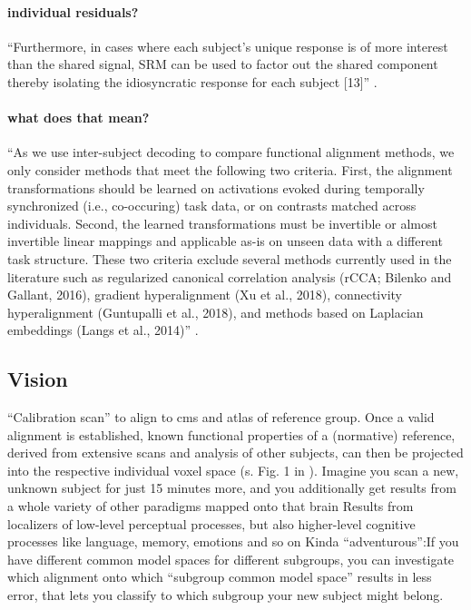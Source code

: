 \paragraph{individual residuals?}

%
``Furthermore, in cases where each subject's unique response is of more interest
than the shared signal, SRM can be used to factor out the shared component
thereby isolating the idiosyncratic response for each subject [13]''
\citep{kumar2020brainiak}.


\paragraph{what does that mean?}

``As we use inter-subject decoding to compare functional alignment methods, we
only consider methods that meet the following two criteria. First, the alignment
transformations should be learned on activations evoked during temporally
synchronized (i.e., co-occuring) task data, or on contrasts matched across
individuals. Second, the learned transformations must be invertible or almost
invertible linear mappings and applicable as-is on unseen data with a different
task structure. These two criteria exclude several methods currently used in the
literature such as regularized canonical correlation analysis (rCCA; Bilenko and
Gallant, 2016), gradient hyperalignment (Xu et al., 2018), connectivity
hyperalignment (Guntupalli et al., 2018), and methods based on Laplacian
embeddings (Langs et al., 2014)'' \citep{bazeille2021empirical}.

\subsection{Vision}

``Calibration scan'' to align to \ac{cms} and atlas of reference group.
%
Once a valid alignment is established, known functional properties of a
(normative) reference, derived from extensive scans and analysis of other
subjects, can then be projected into the respective individual voxel space (s.
Fig. 1 in \citep{nishimoto2016lining}).
%
Imagine you scan a new, unknown subject for just 15 minutes more, and you
additionally get results from a whole variety of other paradigms mapped onto
that brain
%
Results from localizers of low-level perceptual processes, but also higher-level
cognitive processes like language, memory, emotions and so on
%
Kinda ``adventurous'':If you have different common model spaces for different
subgroups, you can investigate which alignment onto which ``subgroup common
model space'' results in less error, that lets you classify to which subgroup
your new subject might belong.


